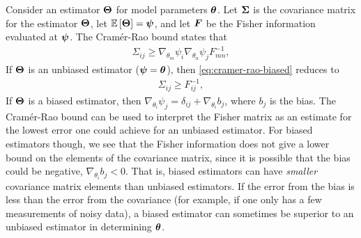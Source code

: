 Consider an estimator ${\bm \Theta}$ for model parameters ${\bm \theta}$.
Let ${\bm \Sigma}$ is the covariance matrix for the estimator ${\bm \Theta}$,
let $\mathbb{E}\left[{\bm \Theta}\right]={\bm \psi}$,
and let ${\bm F}$ be the Fisher information evaluated at ${\bm \psi}$.
The Cram\'{e}r-Rao bound states that
\begin{align}
    \label{eq:cramer-rao-biased}
    \Sigma_{ij} 
    \geq 
    \nabla_{\theta_m}\psi_i
    \nabla_{\theta_n}\psi_j
    F_{mn}^{-1} 
    ,
\end{align}
If ${\bm \Theta}$ is an unbiased estimator (${\bm \psi}={\bm \theta}$), then
\eqref{eq:cramer-rao-biased} reduces to 
\begin{align}
    \label{eq:cramer-rao-unbiased}
    \Sigma_{ij} 
    \geq 
    F_{ij}^{-1} 
    ,
\end{align}
If ${\bm \Theta}$ is a biased estimator, then 
$\nabla_{\theta_i}\psi_j = \delta_{ij} + \nabla_{\theta_i}b_j$, 
where $b_j$ is the bias.
The Cram\'{e}r-Rao bound can be used to interpret the Fisher matrix as an estimate
for the lowest error one could achieve for an unbiased estimator.
For biased estimators though, we see that the Fisher information does not give a lower
bound on the elements of the covariance matrix, since it is possible that the bias
could be negative, $\nabla_{\theta_i}b_j<0$.
That is, biased estimators can have \emph{smaller} 
covariance matrix elements than unbiased estimators.
If the error from the bias is less than the error from the covariance 
(for example, if one only has a few measurements of noisy data),
a biased estimator can sometimes be superior to an unbiased
estimator in determining ${\bm \theta}$.

